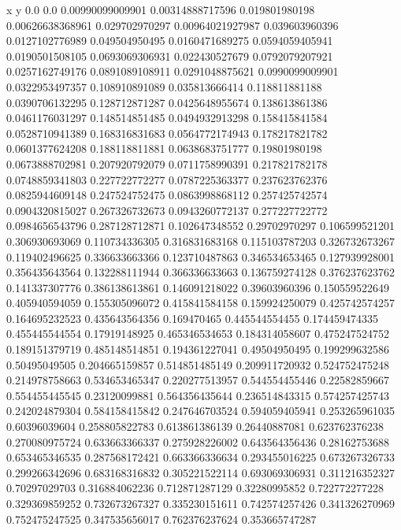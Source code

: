               x                y
            0.0              0.0
0.00990099009901  0.00314888717596
 0.019801980198  0.00626638368961
 0.029702970297  0.00964021927987
 0.039603960396  0.0127102776989
 0.049504950495  0.0160471689275
0.0594059405941  0.0190501508105
0.0693069306931   0.022430527679
0.0792079207921  0.0257162749176
0.0891089108911  0.0291048875621
0.0990099009901  0.0322953497357
 0.108910891089   0.035813666414
 0.118811881188  0.0390706132295
 0.128712871287  0.0425648955674
 0.138613861386  0.0461176031297
 0.148514851485  0.0494932913298
 0.158415841584  0.0528710941389
 0.168316831683  0.0564772174943
 0.178217821782  0.0601377624208
 0.188118811881  0.0638683751777
  0.19801980198  0.0673888702981
 0.207920792079  0.0711758990391
 0.217821782178  0.0748859341803
 0.227722772277  0.0787225363377
 0.237623762376  0.0825944609148
 0.247524752475  0.0863998868112
 0.257425742574  0.0904320815027
 0.267326732673  0.0943260772137
 0.277227722772  0.0984656543796
 0.287128712871   0.102647348552
  0.29702970297   0.106599521201
 0.306930693069   0.110734336305
 0.316831683168   0.115103787203
 0.326732673267   0.119402496625
 0.336633663366   0.123710487863
 0.346534653465   0.127939928001
 0.356435643564   0.132288111944
 0.366336633663   0.136759274128
 0.376237623762   0.141337307776
 0.386138613861   0.146091218022
  0.39603960396   0.150559522649
 0.405940594059   0.155305096072
 0.415841584158   0.159924250079
 0.425742574257   0.164695232523
 0.435643564356      0.169470465
 0.445544554455   0.174459474335
 0.455445544554    0.17919148925
 0.465346534653   0.184314058607
 0.475247524752   0.189151379719
 0.485148514851   0.194361227041
  0.49504950495   0.199299632586
  0.50495049505   0.204665159857
 0.514851485149   0.209911720932
 0.524752475248   0.214978758663
 0.534653465347   0.220277513957
 0.544554455446    0.22582859667
 0.554455445545    0.23120099881
 0.564356435644   0.236514843315
 0.574257425743   0.242024879304
 0.584158415842   0.247646703524
 0.594059405941   0.253265961035
  0.60396039604   0.258805822783
 0.613861386139    0.26440887081
 0.623762376238   0.270080975724
 0.633663366337   0.275928226002
 0.643564356436    0.28162753688
 0.653465346535   0.287568172421
 0.663366336634   0.293455016225
 0.673267326733   0.299266342696
 0.683168316832   0.305221522114
 0.693069306931   0.311216352327
  0.70297029703   0.316884062236
 0.712871287129    0.32280995852
 0.722772277228   0.329369859252
 0.732673267327   0.335230151611
 0.742574257426   0.341326270969
 0.752475247525   0.347535656017
 0.762376237624   0.353665747287
